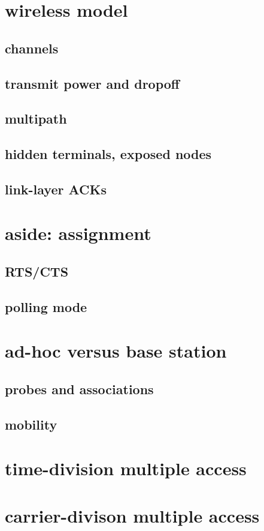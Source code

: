 \section{wireless model}

\subsection{channels}

\subsection{transmit power and dropoff}

\subsection{multipath}

\subsection{hidden terminals, exposed nodes}

\subsection{link-layer ACKs}


\section{aside: assignment}

\subsection{RTS/CTS}

\subsection{polling mode}

\section{ad-hoc versus base station}

\subsection{probes and associations}

\subsection{mobility}

\section{time-division multiple access}

\section{carrier-divison multiple access}

